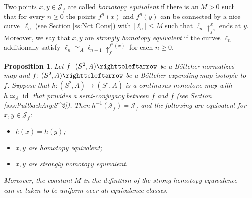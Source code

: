 \documentclass{amsart}
\theoremstyle{plain}
\newtheorem{proposition}[theorem]{Proposition}
\theoremstyle{definition}
\theoremstyle{remark}
\newcommand{\id}{\operatorname{id}}
\renewcommand{\sp}{{\ \ }}
\newcommand{\Jul}{{\mathcal J}}
\newcommand\lift[2]{{\uparrow}_{#1}^{#2}}
\newcommand\selfmap{\righttoleftarrow}
\begin{document}
Two points $x,y \in \Jul_f$ are called \emph{homotopy equivalent} if there is an $M>0$ such that for every $n\ge 0$ the points $f^n(x)$ and $f^n(y)$ can be connected by a nice curve~$\ell_n$ (see Section \ref{ss:Not Conv}) with $|\ell_n|\le M$ such that $\ell_n\lift{f^n}{x}$ ends at $y$. Moreover, we say that $x,y$ are \emph{strongly homotopy equivalent} if the curves $\ell_n$ additionally satisfy  $\ell_n\simeq_{A} \ell_{n+1}\lift{f}{f^n(x)}$ for each $n
\geq 0$.%





\begin{proposition}
\label{prop:hom equiv}
Let $f\colon(S^2,A)\selfmap$ be a B\"ottcher normalized map and $\bar f\colon(S^2,A)\selfmap$ be a B\"ottcher expanding map isotopic to $f$.  Suppose that $h\colon (S^2,A)\to (S^2,A)$ is a continuous monotone map with $h\simeq_A \id$ that provides a semi-conjugacy between $f$ and $\bar f$ (see Section \ref{sss:PullbackArg:S^2}). Then $h^{-1}(\Jul_{\bar f})=\Jul_f$ and the following are equivalent for $x,y\in \Jul_f$:
\begin{itemize}
\item $h(x)=h(y)$;
\item $x,y$ are homotopy equivalent;
\item $x,y$ are strongly homotopy equivalent.
\end{itemize}
Moreover, the constant $M$ in the definition of the strong homotopy equivalence can be taken to be uniform over all equivalence classes. 
\end{proposition}
\end{document}
